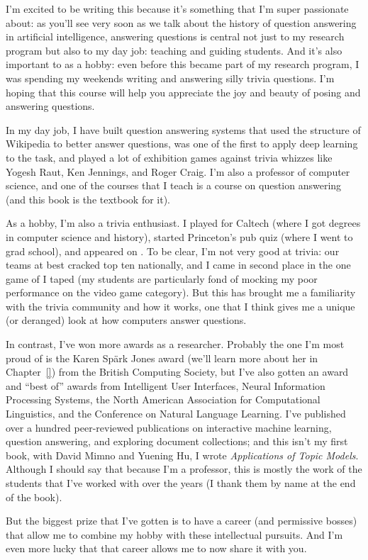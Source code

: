 I’m excited to be writing this because it’s something that I’m super
passionate about: as you’ll see very soon as we talk about the history of
question answering in artificial intelligence, answering questions is central
not just to my research program but also to my day job: teaching and guiding
students.  And it’s also important to as a hobby: even before this became part
of my research program, I was spending my weekends writing and answering silly
trivia questions.  I’m hoping that this course will help you appreciate the
joy and beauty of posing and answering questions.

In my day job, I have built question answering systems that used the structure
of Wikipedia to better answer questions, was one of the first to apply deep
learning to the  task, and played a lot of exhibition games against
trivia whizzes like Yogesh Raut, Ken Jennings, and Roger Craig.  I'm also a
professor of computer science, and one of the courses that I teach is a
course on question answering (and this book is the textbook for it).

As a hobby, I'm also a trivia enthusiast.  I played \qb{} for Caltech (where I
got  degrees in computer science and history), started Princeton's pub
quiz (where I went to grad school), and appeared on \jeopardy{}.
%
To be clear, I'm not very good at trivia: our \qb{} teams at best cracked top
ten nationally, and I came in second place in the one game of \jeopardy{} I
taped (my students are particularly fond of mocking my poor performance on the
video game category).
%
But this has brought me a familiarity with the trivia community and how it
works, one that I think gives me a unique (or deranged) look at how computers
answer questions.

In contrast, I've won more awards as a researcher.
%
Probably the one I'm most proud of is the Karen Sp\"ark Jones award (we'll
learn more about her in Chapter~\ref{}) from the British Computing Society,
but I've also gotten an  award and ``best of'' awards from Intelligent User
Interfaces, Neural Information Processing Systems, the North American
Association for Computational Linguistics, and the Conference on Natural
Language Learning.
%
I've published over a hundred peer-reviewed publications on interactive
machine learning, question answering, and exploring document collections; and
this isn't my first book, with David Mimno and Yuening Hu, I wrote
\emph{Applications of Topic Models}.
%
Although I should say that because I'm a professor, this is mostly the work of
the students that I've worked with over the years (I thank them by name at the
end of the book).

But the biggest prize that I've gotten is to have a career (and permissive
bosses) that allow me to combine my hobby with these intellectual pursuits.
%
And I'm even more lucky that that career allows me to now share it with you.


